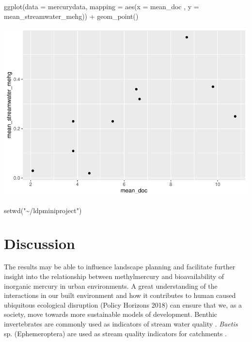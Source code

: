 \documentclass[preprint, 3p,
authoryear]{elsarticle} %
\newenvironment{Shaded}{\begin{snugshade}}{\end{snugshade}}
\newcommand{\AttributeTok}[1]{\textcolor[rgb]{0.77,0.63,0.00}{#1}}
\newcommand{\FunctionTok}[1]{\textcolor[rgb]{0.00,0.00,0.00}{#1}}
\newcommand{\NormalTok}[1]{#1}
\newcommand{\SpecialCharTok}[1]{\textcolor[rgb]{0.00,0.00,0.00}{#1}}
\newcommand{\StringTok}[1]{\textcolor[rgb]{0.31,0.60,0.02}{#1}}
\begin{document}
\begin{Shaded}
\begin{Highlighting}[]
\FunctionTok{ggplot}\NormalTok{(}\AttributeTok{data =}\NormalTok{ mercurydata, }
       \AttributeTok{mapping =} \FunctionTok{aes}\NormalTok{(}\AttributeTok{x =}\NormalTok{ mean\_doc , }\AttributeTok{y =}\NormalTok{ mean\_streamwater\_mehg)) }\SpecialCharTok{+}
  \FunctionTok{geom\_point}\NormalTok{()}
\end{Highlighting}
\end{Shaded}

\includegraphics{ManususcriptRMarkdown_files/figure-latex/unnamed-chunk-1-1.pdf}

\begin{Shaded}
\begin{Highlighting}[]
\FunctionTok{setwd}\NormalTok{(}\StringTok{"\textasciitilde{}/ldpminiproject"}\NormalTok{)}
\end{Highlighting}
\end{Shaded}

\hypertarget{discussion}{%
\section{Discussion}\label{discussion}}

The results may be able to influence landscape planning and facilitate
further insight into the relationship between methylmercury and
bioavailability of inorganic mercury in urban environments. A great
understanding of the interactions in our built environment and how it
contributes to human caused ubiquitous ecological disruption (Policy
Horizons 2018) can ensure that we, as a society, move towards more
sustainable models of development. Benthic invertebrates are commonly
used as indicators of stream water quality \citep{Lescord2018}.
\emph{Baetis} sp. (Ephemeroptera) are used as stream quality indicators
for catchments \citep{Waiser2006}.

\renewcommand\refname{References}

\end{document}
